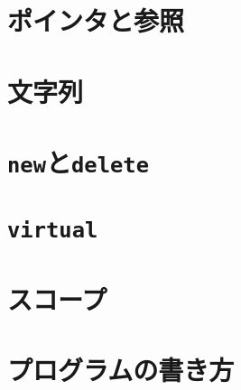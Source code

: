 \section{ポインタと参照}
\label{sec:pointers}

\section{文字列}

\section{\texttt{new}と\texttt{delete}}
\label{sec:newとdelete}

\section{\texttt{virtual}}
\label{subsec:virtual}

\section{スコープ}
\label{sec:スコープ}

\section{プログラムの書き方}
